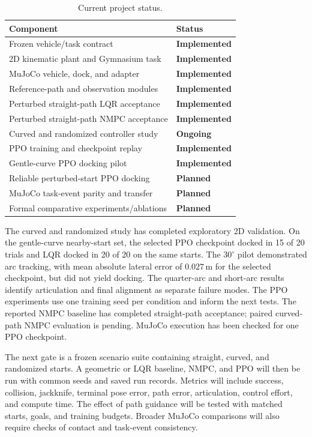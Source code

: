 \documentclass[conference]{IEEEtran}
\newcommand{\implemented}{\textcolor{implementedgreen}{\textbf{Implemented}}}
\newcommand{\planned}{\textcolor{plannedblue}{\textbf{Planned}}}
\newcommand{\ongoing}{\textcolor{ongoingamber}{\textbf{Ongoing}}}
\begin{document}
\begin{table}[t]
  \centering
  \caption{Current project status.}
  \label{tab:status}
  \begin{tabular}{p{}p{}}
    \toprule
    Component & Status \\
    \midrule
    Frozen vehicle/task contract & \implemented \\
    2D kinematic plant and Gymnasium task & \implemented \\
    MuJoCo vehicle, dock, and adapter & \implemented \\
    Reference-path and observation modules & \implemented \\
    Perturbed straight-path LQR acceptance & \implemented \\
    Perturbed straight-path NMPC acceptance & \implemented \\
    Curved and randomized controller study & \ongoing \\
    PPO training and checkpoint replay & \implemented \\
    Gentle-curve PPO docking pilot & \implemented \\
    Reliable perturbed-start PPO docking & \planned \\
    MuJoCo task-event parity and transfer & \planned \\
    Formal comparative experiments/ablations & \planned \\
    \bottomrule
  \end{tabular}
\end{table}

The curved and randomized study has completed exploratory 2D validation.
On the gentle-curve nearby-start set, the selected PPO checkpoint docked
in 15 of 20 trials and LQR docked in 20 of 20 on the same starts.
The $30^\circ$ pilot demonstrated arc tracking, with mean absolute
lateral error of $0.027\,\mathrm{m}$ for the selected checkpoint, but did
not yield docking. The quarter-arc and short-arc results identify
articulation and final alignment as separate failure modes. The PPO
experiments use one training seed per condition and inform the next
tests. The reported NMPC baseline has completed straight-path acceptance;
paired curved-path NMPC evaluation is pending. MuJoCo execution has
been checked for one PPO checkpoint.

The next gate is a frozen scenario suite containing straight, curved, and
randomized starts. A geometric or LQR baseline, NMPC, and PPO will then be run
with common seeds and saved run records. Metrics will include success,
collision, jackknife, terminal pose error, path error, articulation, control
effort, and compute time. The effect of path guidance will be tested with
matched starts, goals, and training budgets. Broader MuJoCo comparisons will
also require checks of contact and task-event consistency.
\end{document}
